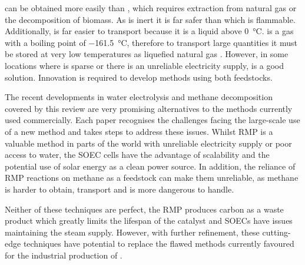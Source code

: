  can be obtained more easily than  , which requires extraction from natural gas or the decomposition of biomass.
As  is inert it is far safer than   which is flammable.
Additionally,   is far easier to transport because it is a liquid above \SI{0}{\celsius}.
 is a gas with a boiling point of \SI{-161.5}{\celsius}\cite{Lemmon2017}, therefore to transport large quantities it must be stored at very low temperatures as liquefied natural gas \cite{lngamerica}.
However, in some locations where   is sparse or there is an unreliable electricity supply,  is a good solution\cite{SBN2020}.
Innovation is required to develop methods using both feedstocks.

The recent developments in water electrolysis and methane decomposition covered by this review are very promising alternatives to the methods currently used commercially.
Each paper recognises the challenges facing the large-scale use of a new method and takes steps to address these issues.
Whilst RMP is a valuable method in parts of the world with unreliable electricity supply or poor access to water, the SOEC cells have the advantage of scalability and the potential use of solar energy as a clean power source. 
In addition, the reliance of RMP reactions on methane as a feedstock can make them unreliable, as methane is harder to obtain, transport and is more dangerous to handle.

Neither of these techniques are perfect, the RMP produces carbon as a waste product which greatly limits the lifespan of the catalyst and SOECs have issues maintaining the steam supply.
However, with further refinement, these cutting-edge techniques have potential to replace the flawed methods currently favoured for the industrial production of  .

